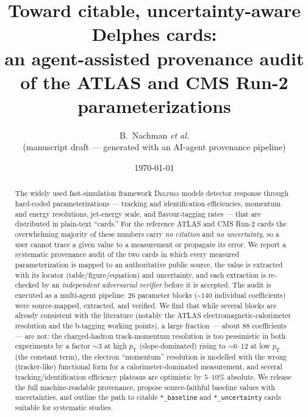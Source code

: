 \documentclass[11pt,a4paper]{article}
\title{\bf Toward citable, uncertainty-aware Delphes cards:\\
an agent-assisted provenance audit of the ATLAS and CMS Run-2 parameterizations}
\author{B.~Nachman \emph{et al.}\\[2pt]
\small (manuscript draft --- generated with an AI-agent provenance pipeline)}
\date{\today}
\begin{document}
\maketitle

\begin{abstract}
\noindent
The widely used fast-simulation framework \textsc{Delphes} models detector
response through hard-coded parameterizations --- tracking and identification
efficiencies, momentum and energy resolutions, jet-energy scale, and
flavour-tagging rates --- that are distributed in plain-text ``cards.'' For the
reference ATLAS and CMS Run-2 cards the overwhelming majority of these numbers
carry \emph{no citation} and \emph{no uncertainty}, so a user cannot trace a
given value to a measurement or propagate its error. We report a systematic
provenance audit of the two cards in which every measured parameterization is
mapped to an authoritative public source, the value is extracted with its
locator (table/figure/equation) and uncertainty, and each extraction is
re-checked by an \emph{independent adversarial verifier} before it is accepted.
The audit is executed as a multi-agent pipeline: $26$ parameter blocks
(\textasciitilde$140$ individual coefficients) were source-mapped, extracted,
and verified. We find that while several blocks are already consistent with the
literature (notably the ATLAS electromagnetic-calorimeter resolution and the
b-tagging working points), a large fraction --- about $88$ coefficients --- are
not: the charged-hadron track-momentum resolution is too pessimistic in both
experiments by a factor $\sim\!3$ at high $p_\mathrm{T}$ (slope-dominated) rising
to $\sim\!6$--$12$ at low $p_\mathrm{T}$ (the constant term), the electron
``momentum'' resolution is
modelled with the wrong (tracker-like) functional form for a
calorimeter-dominated measurement, and several tracking/identification
efficiency plateaus are optimistic by $5$--$10\%$ absolute. We release the full
machine-readable provenance, propose source-faithful baseline values with
uncertainties, and outline the path to citable \texttt{*\_baseline} and
\texttt{*\_uncertainty} cards suitable for systematic studies.
\end{abstract}
\end{document}

